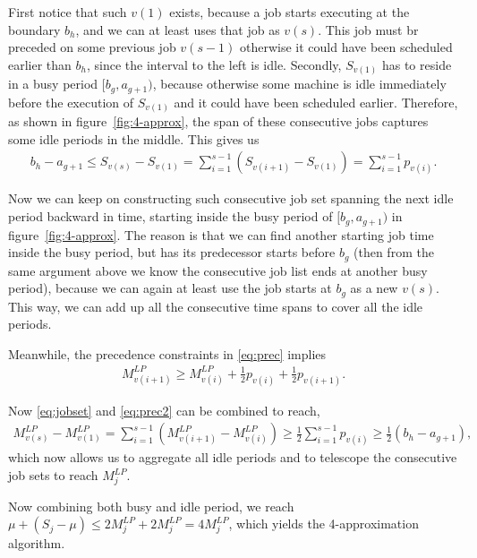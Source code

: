 First notice that such $v(1)$ exists, because a job starts executing at the boundary $b_h$, and we can at least uses that job as $v(s)$. This job must br preceded on some previous job $v(s-1)$ otherwise it could have been scheduled earlier than $b_h$, since the interval to the left is idle. Secondly, $S_{v(1)}$ has to reside in a busy period $[b_g, a_{g+1})$, because otherwise some machine is idle immediately before the execution of $S_{v(1)}$ and it could have been scheduled earlier. Therefore, as shown in figure~\ref{fig:4-approx}, the span of these consecutive jobs captures some idle periods in the middle. This gives us 
\begin{align}
b_h - a_{g+1} \leq S_{v(s)} - S_{v(1)} = \sum_{i=1}^{s-1}(S_{v(i+1)} - S_{v(1)}) = \sum_{i=1}^{s-1} p_{v(i)}. \label{eq:jobset}
\end{align}

Now we can keep on constructing such consecutive job set spanning the next idle period backward in time, starting inside the busy period of $[b_g, a_{g+1})$ in figure~\ref{fig:4-approx}. The reason is that we can find another starting job time inside the busy period, but has its predecessor starts before $b_g$ (then from the same argument above we know the consecutive job list ends at another busy period), because we can again at least use the job starts at $b_g$ as a new $v(s)$. This way, we can add up all the consecutive time spans to cover all the idle periods. 

Meanwhile, the precedence constraints in \eqref{eq:prec} implies
\begin{align}
M^{LP}_{v(i+1)} \geq M^{LP}_{v(i)} + \frac{1}{2}p_{v(i)} + \frac{1}{2}p_{v(i+1)}. \label{eq:prec2}
\end{align}

Now \eqref{eq:jobset} and \eqref{eq:prec2} can be combined to reach,
\begin{align}
M^{LP}_{v(s)} - M^{LP}_{v(1)} = \sum_{i=1}^{s-1} \left(M^{LP}_{v(i+1)} - M^{LP}_{v(i)}\right) \geq \frac{1}{2}\sum_{i=1}^{s-1} p_{v(i)} \geq \frac{1}{2} (b_h-a_{g+1}),
\end{align}
which now allows us to aggregate all idle periods and to telescope the consecutive job sets to reach $M_j^{LP}$. 

Now combining both busy and idle period, we reach $\mu + (S_j - \mu) \leq 2M_j^{LP} + 2M_j^{LP} = 4M_j^{LP}$, which yields the 4-approximation algorithm.

